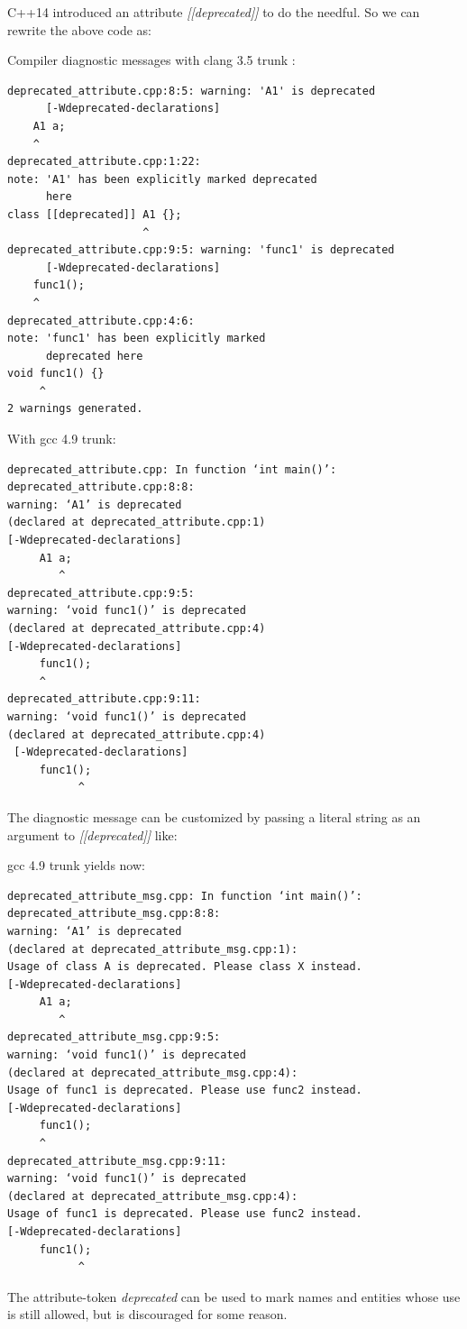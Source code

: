 \begin{Answer}[ref=ex023]
C++14 introduced an attribute \emph{[[deprecated]]} to do the needful. So we can rewrite the above code as:


Compiler diagnostic messages with clang 3.5 trunk :
\begin{verbatim}
deprecated_attribute.cpp:8:5: warning: 'A1' is deprecated
      [-Wdeprecated-declarations]
    A1 a;
    ^
deprecated_attribute.cpp:1:22: 
note: 'A1' has been explicitly marked deprecated
      here
class [[deprecated]] A1 {};
                     ^
deprecated_attribute.cpp:9:5: warning: 'func1' is deprecated
      [-Wdeprecated-declarations]
    func1();
    ^
deprecated_attribute.cpp:4:6: 
note: 'func1' has been explicitly marked
      deprecated here
void func1() {}
     ^
2 warnings generated.
\end{verbatim}
With gcc 4.9 trunk:
\begin{verbatim}
deprecated_attribute.cpp: In function ‘int main()’:
deprecated_attribute.cpp:8:8: 
warning: ‘A1’ is deprecated 
(declared at deprecated_attribute.cpp:1) 
[-Wdeprecated-declarations]
     A1 a;
        ^
deprecated_attribute.cpp:9:5: 
warning: ‘void func1()’ is deprecated 
(declared at deprecated_attribute.cpp:4) 
[-Wdeprecated-declarations]
     func1();
     ^
deprecated_attribute.cpp:9:11: 
warning: ‘void func1()’ is deprecated 
(declared at deprecated_attribute.cpp:4)
 [-Wdeprecated-declarations]
     func1();
           ^
\end{verbatim}

The diagnostic message can be customized by passing a literal string as an argument to \emph{[[deprecated]]} like:

gcc 4.9 trunk yields now:
\begin{verbatim}
deprecated_attribute_msg.cpp: In function ‘int main()’:
deprecated_attribute_msg.cpp:8:8: 
warning: ‘A1’ is deprecated 
(declared at deprecated_attribute_msg.cpp:1): 
Usage of class A is deprecated. Please class X instead. 
[-Wdeprecated-declarations]
     A1 a;
        ^
deprecated_attribute_msg.cpp:9:5: 
warning: ‘void func1()’ is deprecated 
(declared at deprecated_attribute_msg.cpp:4): 
Usage of func1 is deprecated. Please use func2 instead. 
[-Wdeprecated-declarations]
     func1();
     ^
deprecated_attribute_msg.cpp:9:11: 
warning: ‘void func1()’ is deprecated 
(declared at deprecated_attribute_msg.cpp:4): 
Usage of func1 is deprecated. Please use func2 instead. 
[-Wdeprecated-declarations]
     func1();
           ^
\end{verbatim}
The attribute-token \emph{deprecated} can be used to mark names and entities whose use is still allowed, but is discouraged for some reason.


\end{Answer}
